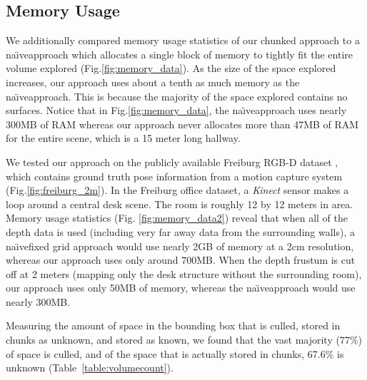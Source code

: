 \documentclass[10pt,twocolumn,letterpaper]{article}
\newcommand{\figref}[1]{Fig.\ref{#1}}
\newcommand{\tabref}[1]{Table~\ref{#1}}
\newcommand{\naive}{na\"{\i}ve}
\begin{document}
\subsection{Memory Usage}
\label{section:memory}
We additionally compared memory usage statistics of our chunked approach to a
\naive approach which allocates a single block of memory to tightly fit the
entire volume explored (\figref{fig:memory_data}). As the size of the space
explored increases, our approach uses about a tenth as much memory as the
\naive approach. This is because the majority of the space explored contains no
surfaces. Notice that in \figref{fig:memory_data}, the \naive approach uses
nearly 300MB of RAM whereas our approach never allocates more than 47MB of RAM
for the entire scene, which is a 15 meter long hallway.

We tested our approach on the publicly available Freiburg RGB-D dataset
\cite{FREIBURG}, which contains ground truth pose information from a motion
capture system (\figref{fig:freiburg_2m}). In the Freiburg office dataset, a
\textit{Kinect} sensor makes a loop around a central desk scene. The room is
roughly 12 by 12 meters in area.  Memory usage statistics (Fig.
\ref{fig:memory_data2}) reveal that when all of the depth data is used
(including very far away data from the surrounding walls), a \naive fixed grid
approach would use nearly 2GB of memory at a 2cm resolution, whereas our
approach uses only around 700MB. When the depth frustum is cut off at 2 meters
(mapping only the desk structure without the surrounding room), our approach
uses only 50MB of memory, whereas the \naive approach would use nearly 300MB.

Measuring the amount of space in the bounding box that is culled, stored in
chunks as unknown, and stored as known, we found that the vast majority (77\%)
of space is culled, and of the space that is actually stored in chunks, 67.6\%
is unknown (\tabref{table:volumecount}).

\end{document}
